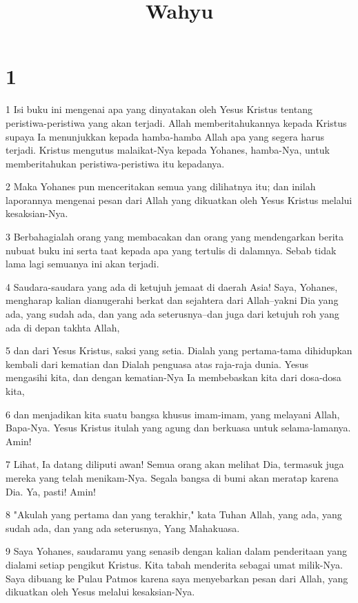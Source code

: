 

\title{Wahyu}


\chapter{1}

\par 1 Isi buku ini mengenai apa yang dinyatakan oleh Yesus Kristus tentang peristiwa-peristiwa yang akan terjadi. Allah memberitahukannya kepada Kristus supaya Ia menunjukkan kepada hamba-hamba Allah apa yang segera harus terjadi. Kristus mengutus malaikat-Nya kepada Yohanes, hamba-Nya, untuk memberitahukan peristiwa-peristiwa itu kepadanya.
\par 2 Maka Yohanes pun menceritakan semua yang dilihatnya itu; dan inilah laporannya mengenai pesan dari Allah yang dikuatkan oleh Yesus Kristus melalui kesaksian-Nya.
\par 3 Berbahagialah orang yang membacakan dan orang yang mendengarkan berita nubuat buku ini serta taat kepada apa yang tertulis di dalamnya. Sebab tidak lama lagi semuanya ini akan terjadi.
\par 4 Saudara-saudara yang ada di ketujuh jemaat di daerah Asia! Saya, Yohanes, mengharap kalian dianugerahi berkat dan sejahtera dari Allah--yakni Dia yang ada, yang sudah ada, dan yang ada seterusnya--dan juga dari ketujuh roh yang ada di depan takhta Allah,
\par 5 dan dari Yesus Kristus, saksi yang setia. Dialah yang pertama-tama dihidupkan kembali dari kematian dan Dialah penguasa atas raja-raja dunia. Yesus mengasihi kita, dan dengan kematian-Nya Ia membebaskan kita dari dosa-dosa kita,
\par 6 dan menjadikan kita suatu bangsa khusus imam-imam, yang melayani Allah, Bapa-Nya. Yesus Kristus itulah yang agung dan berkuasa untuk selama-lamanya. Amin!
\par 7 Lihat, Ia datang diliputi awan! Semua orang akan melihat Dia, termasuk juga mereka yang telah menikam-Nya. Segala bangsa di bumi akan meratap karena Dia. Ya, pasti! Amin!
\par 8 "Akulah yang pertama dan yang terakhir," kata Tuhan Allah, yang ada, yang sudah ada, dan yang ada seterusnya, Yang Mahakuasa.
\par 9 Saya Yohanes, saudaramu yang senasib dengan kalian dalam penderitaan yang dialami setiap pengikut Kristus. Kita tabah menderita sebagai umat milik-Nya. Saya dibuang ke Pulau Patmos karena saya menyebarkan pesan dari Allah, yang dikuatkan oleh Yesus melalui kesaksian-Nya.
